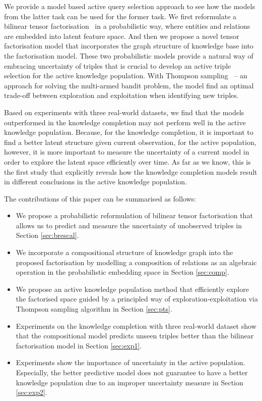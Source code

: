 We provide a model based active query selection approach to see how the models from the latter task can be used for the former task. We first reformulate a bilinear tensor factorisation~\cite{nickel2015review} in a probabilistic way, where entities and relations are embedded into latent feature space. And then we propose a novel tensor factorisation model that incorporates the graph structure of knowledge base into the factorisation model. These two probabilistic models provide a natural way of embracing uncertainty of triples that is crucial to develop 
an active triple selection for the active knowledge population.
With Thompson sampling~\cite{scott10bandit} -- an approach for solving the multi-armed bandit problem,
the model find an optimal trade-off between exploration and exploitation when identifying new triples.

Based on experiments with three real-world datasets, we find that the models outperformed in the knowledge completion may not perform well in the active knowledge population. Because, for the knowledge completion, it is important to find a better latent structure given current observation, for the active population, however, it is more important to  measure the uncertainty of a current model in order to explore the latent space efficiently over time.
As far as we know, this is the first study that explicitly reveals how the knowledge completion models result in different conclusions in the active knowledge population.

The contributions of this paper can be summarised as follows:
\begin{itemize}
\item We propose a probabilistic reformulation of bilinear tensor factorisation that allows us to predict and measure the uncertainty of unobserved triples in Section \ref{sec:brescal}.
\item We incorporate a compositional structure of knowledge graph into the proposed factorisation by modelling a composition of relations as an algebraic operation in the probabilistic embedding space in Section \ref{sec:comp}.
\item We propose an active knowledge population method that efficiently explore the factorised space guided by a principled way of exploration-exploitation via Thompson sampling algorithm in Section \ref{sec:pts}.
\item Experiments on the knowledge completion with three real-world dataset show that the compositional model predicts unseen triples better than the bilinear factorisation model in Section \ref{sec:exp1}.
\item Experiments show the importance of uncertainty in the active population. Especially, the better predictive model does not guarantee to have a better knowledge population due to an improper uncertainty measure in Section \ref{sec:exp2}.
\end{itemize}

